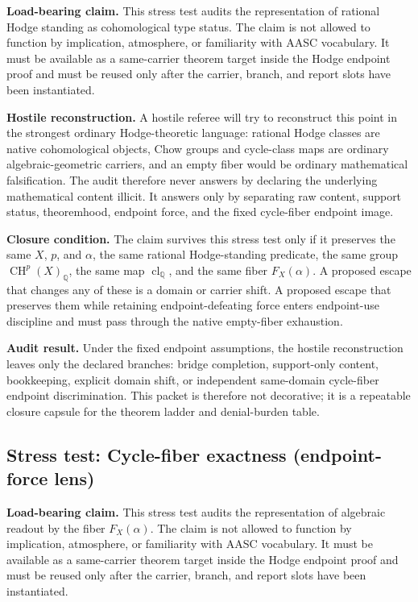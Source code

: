 \documentclass[11pt]{article}
\newcommand{\QQ}{\mathbb{Q}}
\newcommand{\CH}{\operatorname{CH}}
\newcommand{\clQ}{\operatorname{cl}_{\QQ}}
\begin{document}
\par\noindent\textbf{Load-bearing claim.} This stress test audits the representation of rational Hodge standing as cohomological type status. The claim is not allowed to function by implication, atmosphere, or familiarity with AASC vocabulary. It must be available as a same-carrier theorem target inside the Hodge endpoint proof and must be reused only after the carrier, branch, and report slots have been instantiated.

\par\noindent\textbf{Hostile reconstruction.} A hostile referee will try to reconstruct this point in the strongest ordinary Hodge-theoretic language: rational Hodge classes are native cohomological objects, Chow groups and cycle-class maps are ordinary algebraic-geometric carriers, and an empty fiber would be ordinary mathematical falsification. The audit therefore never answers by declaring the underlying mathematical content illicit. It answers only by separating raw content, support status, theoremhood, endpoint force, and the fixed cycle-fiber endpoint image.

\par\noindent\textbf{Closure condition.} The claim survives this stress test only if it preserves the same $X$, $p$, and $\alpha$, the same rational Hodge-standing predicate, the same group $\CH^p(X)_\QQ$, the same map $\clQ$, and the same fiber $F_X(\alpha)$. A proposed escape that changes any of these is a domain or carrier shift. A proposed escape that preserves them while retaining endpoint-defeating force enters endpoint-use discipline and must pass through the native empty-fiber exhaustion.

\par\noindent\textbf{Audit result.} Under the fixed endpoint assumptions, the hostile reconstruction leaves only the declared branches: bridge completion, support-only content, bookkeeping, explicit domain shift, or independent same-domain cycle-fiber endpoint discrimination. This packet is therefore not decorative; it is a repeatable closure capsule for the theorem ladder and denial-burden table.


\subsection{Stress test: Cycle-fiber exactness (endpoint-force lens)}

\par\noindent\textbf{Load-bearing claim.} This stress test audits the representation of algebraic readout by the fiber $F_X(\alpha)$. The claim is not allowed to function by implication, atmosphere, or familiarity with AASC vocabulary. It must be available as a same-carrier theorem target inside the Hodge endpoint proof and must be reused only after the carrier, branch, and report slots have been instantiated.
\end{document}
